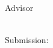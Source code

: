 
\pagestyle{empty}
\begin{titlepage}
  \begin{center}
    \vspace{2cm}
    \scalebox{0.75}{}
    \par
    \vspace{3cm}
    \textsc{\LARGE \vartitle \\ \vspace{0.3cm} \large }\par
    \vspace{2cm}
    {\large \vartype} \\
    {\large \varauthor} \par
    \vspace{2cm}
    Advisor \\
    \varsupervisor \\
    \varinstitute \par
    \vspace{2cm}
    {\large Submission: \vardate}
  \end{center}
\end{titlepage}